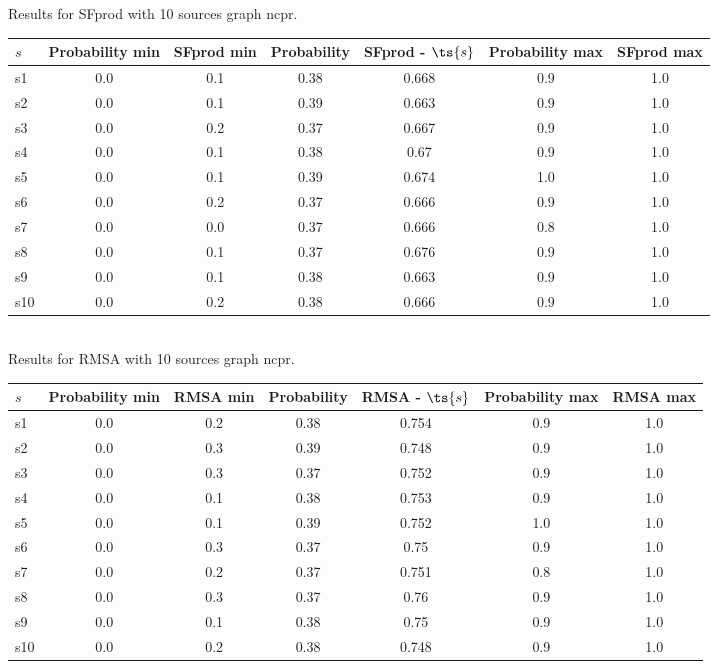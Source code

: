 \documentclass{article}
\begin{document}
\noindent Results for SFprod with 10 sources graph ncpr.

\noindent\begin{tabular}{|l|c|c|c|c|c|c|}
\hline
$s$& Probability min & SFprod min & Probability & SFprod - $\ts{s}$ & Probability max & SFprod max\\
\hline
s1 &0.0 & 0.1 & 0.38 & 0.668 & 0.9 & 1.0\\
\hline
s2 &0.0 & 0.1 & 0.39 & 0.663 & 0.9 & 1.0\\
\hline
s3 &0.0 & 0.2 & 0.37 & 0.667 & 0.9 & 1.0\\
\hline
s4 &0.0 & 0.1 & 0.38 & 0.67 & 0.9 & 1.0\\
\hline
s5 &0.0 & 0.1 & 0.39 & 0.674 & 1.0 & 1.0\\
\hline
s6 &0.0 & 0.2 & 0.37 & 0.666 & 0.9 & 1.0\\
\hline
s7 &0.0 & 0.0 & 0.37 & 0.666 & 0.8 & 1.0\\
\hline
s8 &0.0 & 0.1 & 0.37 & 0.676 & 0.9 & 1.0\\
\hline
s9 &0.0 & 0.1 & 0.38 & 0.663 & 0.9 & 1.0\\
\hline
s10 &0.0 & 0.2 & 0.38 & 0.666 & 0.9 & 1.0\\
\hline
\end{tabular}\\

\noindent Results for RMSA with 10 sources graph ncpr.

\noindent\begin{tabular}{|l|c|c|c|c|c|c|}
\hline
$s$& Probability min & RMSA min & Probability & RMSA - $\ts{s}$ & Probability max & RMSA max\\
\hline
s1 &0.0 & 0.2 & 0.38 & 0.754 & 0.9 & 1.0\\
\hline
s2 &0.0 & 0.3 & 0.39 & 0.748 & 0.9 & 1.0\\
\hline
s3 &0.0 & 0.3 & 0.37 & 0.752 & 0.9 & 1.0\\
\hline
s4 &0.0 & 0.1 & 0.38 & 0.753 & 0.9 & 1.0\\
\hline
s5 &0.0 & 0.1 & 0.39 & 0.752 & 1.0 & 1.0\\
\hline
s6 &0.0 & 0.3 & 0.37 & 0.75 & 0.9 & 1.0\\
\hline
s7 &0.0 & 0.2 & 0.37 & 0.751 & 0.8 & 1.0\\
\hline
s8 &0.0 & 0.3 & 0.37 & 0.76 & 0.9 & 1.0\\
\hline
s9 &0.0 & 0.1 & 0.38 & 0.75 & 0.9 & 1.0\\
\hline
s10 &0.0 & 0.2 & 0.38 & 0.748 & 0.9 & 1.0\\
\hline
\end{tabular}\\
\end{document}
